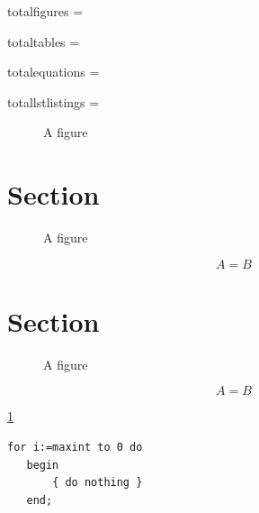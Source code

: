 \documentclass{article}
\begin{document}

totalfigures = \totalfigures \par
totaltables = \totaltables \par
totalequations = \totalequations \par
totallstlistings = \totallstlistings\par


\iftotalfigures\listoffigures\fi

\iftotaltables\listoftables\fi

\iftotallstlistings\lstlistoflistings\fi

\begin{figure}
\caption{A figure}
\label{A}
\end{figure}

\section{Section}
\begin{figure}
\caption{A figure}
\end{figure}
\begin{equation}
A = B
\end{equation}

\section{Section}
\begin{figure}
\caption{A figure}
\end{figure}
\begin{equation}
A = B
\end{equation}

\bigskip
\ref{A}
\clearpage

   \begin{lstlisting}[caption={Useless code},label=useless,captionpos=t]
   for i:=maxint to 0 do
   begin
       { do nothing }
   end;
   \end{lstlisting}
\end{document}

